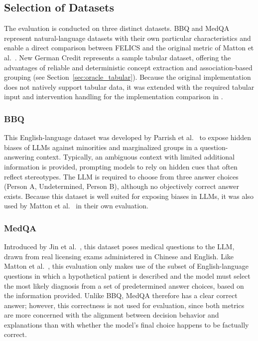 \subsection{Selection of Datasets}
The evaluation is conducted on three distinct datasets. BBQ and MedQA represent natural-language datasets with their own particular characteristics and enable a direct comparison between FELICS and the original metric of Matton et al.~\cite{mattonWalkTalkMeasuring2024}. New German Credit represents a sample tabular dataset, offering the advantages of reliable and deterministic concept extraction and association-based grouping (see Section~\ref{sec:oracle_tabular}). Because the original implementation does not natively support tabular data, it was extended with the required tabular input and intervention handling for the implementation comparison in .

\subsubsection{BBQ}
This English-language dataset was developed by Parrish et al.~\cite{parrishBBQHandbuiltBias2022} to expose hidden biases of LLMs against minorities and marginalized groups in a question-answering context. Typically, an ambiguous context with limited additional information is provided, prompting models to rely on hidden cues that often reflect stereotypes. The LLM is required to choose from three answer choices (Person A, Undetermined, Person B), although no objectively correct answer exists. Because this dataset is well suited for exposing biases in LLMs, it was also used by Matton et al.~\cite{mattonWalkTalkMeasuring2024} in their own evaluation.

\subsubsection{MedQA}
Introduced by Jin et al.~\cite{jinWhatDiseaseDoes2021}, this dataset poses medical questions to the LLM, drawn from real licensing exams administered in Chinese and English. Like Matton et al.~\cite{mattonWalkTalkMeasuring2024}, this evaluation only makes use of the subset of English-language questions in which a hypothetical patient is described and the model must select the most likely diagnosis from a set of predetermined answer choices, based on the information provided. Unlike BBQ, MedQA therefore has a clear correct answer; however, this correctness is not used for evaluation, since both metrics are more concerned with the alignment between decision behavior and explanations than with whether the model's final choice happens to be factually correct.

